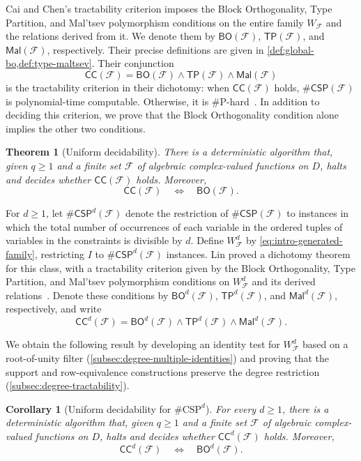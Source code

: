 \documentclass[11pt,letterpaper,onecolumn]{article}
\theoremstyle{plain}
\newtheorem{theorem}{Theorem}[section]
\newtheorem{corollary}[corollary]{Corollary}
\theoremstyle{definition}
\theoremstyle{remark}
\newcommand{\cF}{\mathcal F}
\newcommand{\CC}{\mathsf{CC}}
\newcommand{\BO}{\mathsf{BO}}
\newcommand{\TP}{\mathsf{TP}}
\newcommand{\Mal}{\mathsf{Mal}}
\newcommand{\CSP}[1]{\mathsf{\#CSP}(#1)}
\newcommand{\CSPdeg}[2]{\mathsf{\#CSP}^{#1}(#2)}
\newcommand{\WFdeg}[1]{W_{\cF}^{#1}}
\begin{document}
Cai and Chen's tractability criterion imposes the Block Orthogonality,
Type Partition, and Mal'tsev polymorphism conditions on the entire family
$W_{\cF}$ and the relations derived from it.  We denote them by
$\BO(\cF)$, $\TP(\cF)$, and $\Mal(\cF)$, respectively. Their precise
definitions are given in \cref{def:global-bo,def:type-maltsev}.  Their conjunction
\[
  \CC(\cF)=\BO(\cF)\wedge\TP(\cF)\wedge\Mal(\cF)
\]
is the tractability criterion in their dichotomy: when $\CC(\cF)$ holds,
$\CSP{\cF}$ is polynomial-time computable. Otherwise, it is
$\#\mathrm P$-hard~\cite[Theorem~1 and Sections~3.1--3.2]{CaiChen2017}.
In addition to deciding this criterion, we prove that the Block Orthogonality
condition alone implies the other two conditions.

\begin{theorem}[Uniform decidability]
\label{thm:main}
There is a deterministic algorithm that, given $q\ge1$ and a finite set
$\cF$ of algebraic complex-valued functions on $D$, halts and decides
whether $\CC(\cF)$ holds.  Moreover,
\begin{equation}
  \CC(\cF)\quad\Longleftrightarrow\quad\BO(\cF).
  \label{eq:main-equivalence}
\end{equation}
\end{theorem}

For $d\ge1$, let $\CSPdeg{d}{\cF}$ denote the restriction of $\CSP{\cF}$
to instances in which the total number of occurrences of each variable in
the ordered tuples of variables in the constraints is divisible by $d$.
Define $\WFdeg{d}$ by
\eqref{eq:intro-generated-family}, restricting $I$ to $\CSPdeg{d}{\cF}$
instances.  Lin proved a dichotomy theorem for this class, with a tractability
criterion given by the Block Orthogonality, Type Partition, and Mal'tsev
polymorphism conditions on $\WFdeg{d}$ and its derived
relations~\cite[Theorem~3]{Lin2021}.  Denote these conditions by
$\BO^d(\cF)$, $\TP^d(\cF)$, and $\Mal^d(\cF)$, respectively, and write
\[
  \CC^d(\cF)
  =\BO^d(\cF)\wedge\TP^d(\cF)\wedge\Mal^d(\cF).
\]

We obtain the following result by developing an identity test for
$\WFdeg{d}$ based on a root-of-unity filter
(\cref{subsec:degree-multiple-identities}) and proving that the support and
row-equivalence constructions preserve the degree restriction
(\cref{subsec:degree-tractability}).

\begin{corollary}[Uniform decidability for $\#\mathrm{CSP}^{d}$]
\label{cor:degree-multiple-main}
For every $d\ge1$, there is a deterministic algorithm that, given $q\ge1$
and a finite set $\cF$ of algebraic complex-valued functions on $D$,
halts and decides whether $\CC^d(\cF)$ holds.  Moreover,
\[
  \CC^d(\cF)\quad\Longleftrightarrow\quad\BO^d(\cF).
\]
\end{corollary}
\end{document}
